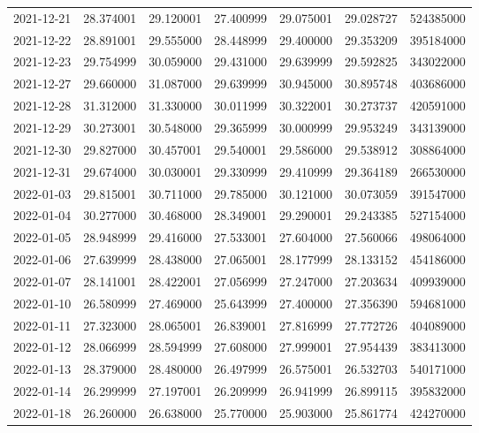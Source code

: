 \begin{tabular}{lrrrrrr}
2021-12-21 &   28.374001 &   29.120001 &   27.400999 &   29.075001 &   29.028727 &   524385000 \\
2021-12-22 &   28.891001 &   29.555000 &   28.448999 &   29.400000 &   29.353209 &   395184000 \\
2021-12-23 &   29.754999 &   30.059000 &   29.431000 &   29.639999 &   29.592825 &   343022000 \\
2021-12-27 &   29.660000 &   31.087000 &   29.639999 &   30.945000 &   30.895748 &   403686000 \\
2021-12-28 &   31.312000 &   31.330000 &   30.011999 &   30.322001 &   30.273737 &   420591000 \\
2021-12-29 &   30.273001 &   30.548000 &   29.365999 &   30.000999 &   29.953249 &   343139000 \\
2021-12-30 &   29.827000 &   30.457001 &   29.540001 &   29.586000 &   29.538912 &   308864000 \\
2021-12-31 &   29.674000 &   30.030001 &   29.330999 &   29.410999 &   29.364189 &   266530000 \\
2022-01-03 &   29.815001 &   30.711000 &   29.785000 &   30.121000 &   30.073059 &   391547000 \\
2022-01-04 &   30.277000 &   30.468000 &   28.349001 &   29.290001 &   29.243385 &   527154000 \\
2022-01-05 &   28.948999 &   29.416000 &   27.533001 &   27.604000 &   27.560066 &   498064000 \\
2022-01-06 &   27.639999 &   28.438000 &   27.065001 &   28.177999 &   28.133152 &   454186000 \\
2022-01-07 &   28.141001 &   28.422001 &   27.056999 &   27.247000 &   27.203634 &   409939000 \\
2022-01-10 &   26.580999 &   27.469000 &   25.643999 &   27.400000 &   27.356390 &   594681000 \\
2022-01-11 &   27.323000 &   28.065001 &   26.839001 &   27.816999 &   27.772726 &   404089000 \\
2022-01-12 &   28.066999 &   28.594999 &   27.608000 &   27.999001 &   27.954439 &   383413000 \\
2022-01-13 &   28.379000 &   28.480000 &   26.497999 &   26.575001 &   26.532703 &   540171000 \\
2022-01-14 &   26.299999 &   27.197001 &   26.209999 &   26.941999 &   26.899115 &   395832000 \\
2022-01-18 &   26.260000 &   26.638000 &   25.770000 &   25.903000 &   25.861774 &   424270000 \\

\end{tabular}
